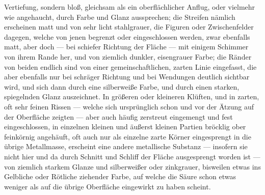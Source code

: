 \documentclass[a4paper, 11pt, oneside, german]{article}
\begin{document}
Vertiefung, sondern bloß, gleichsam als ein oberflächlicher Anflug, oder vielmehr wie angehaucht, durch Farbe und Glanz aussprechen; die Streifen nämlich erscheinen matt und von sehr licht stahlgrauer, die Figuren oder Zwischenfelder dagegen, welche von jenen begrenzt oder eingeschlossen werden, zwar ebenfalls matt, aber doch --- bei schiefer Richtung der Fläche --- mit einigem Schimmer von ihrem Rande her, und von ziemlich dunkler, eisengrauer Farbe; die Ränder von beiden endlich sind von einer gemeinschaftlichen, zarten Linie eingefasst, die aber ebenfalls nur bei schräger Richtung und bei Wendungen deutlich sichtbar wird, und sich dann durch eine silberweiße Farbe, und durch einen starken, spiegelnden Glanz auszeichnet. In größeren oder kleineren Klüften, und in zarten, oft sehr feinen Rissen --- welche sich ursprünglich schon und vor der Ätzung auf der Oberfläche zeigten --- aber auch häufig zerstreut eingemengt und fest eingeschlossen, in einzelnen kleinen und äußerst kleinen Partien bröcklig ober feinkörnig angehäuft, oft auch nur als einzelne zarte Körner eingesprengt in die übrige Metallmasse, erscheint eine andere metallische Substanz --- insofern sie nicht hier und da durch Schnitt und Schliff der Fläche ausgesprengt worden ist --- von ziemlich starkem Glanze und silberweißer oder zinkgrauer, bisweilen etwas ins Gelbliche oder Rötliche ziehender Farbe, auf welche die Säure schon etwas weniger als auf die übrige Oberfläche eingewirkt zu haben scheint.
\end{document}
